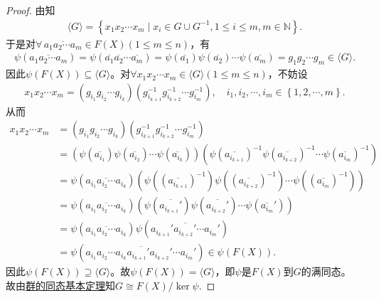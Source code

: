 \documentclass[../../main.tex]{subfiles}%
\begin{document}
\begin{proof}
由知
\begin{align*}
\langle G\rangle =\left\{ x_1x_2\cdots x_m\mid x_i\in G\cup G^{-1},1\leqslant i\leqslant m,m\in \mathbb{N} \right\}.
\end{align*}
于是对$\forall \,\overline{a_1a_2\cdots a_m}\in F\left( X \right) \left( 1\leqslant m\leqslant n \right)$，有
\begin{align*}
\psi \left( \overline{a_1a_2\cdots a_m} \right) =\psi \left( \overline{a_1}\overline{a_2}\cdots \overline{a_m} \right) =\psi \left( \overline{a_1} \right) \psi \left( \overline{a_2} \right) \cdots \psi \left( \overline{a_m} \right) =g_1g_2\cdots g_m\in \langle G\rangle.
\end{align*}
因此$\psi \left( F\left( X \right) \right) \subseteq \langle G\rangle$。对$\forall x_1x_2\cdots x_m\in \langle G\rangle \left( 1\leqslant m\leqslant n \right)$，不妨设
\begin{align*}
x_1x_2\cdots x_m=\left( g_{i_1}g_{i_2}\cdots g_{i_k} \right) \left( g_{i_{k+1}}^{-1}g_{i_{k+2}}^{-1}\cdots g_{i_m}^{-1} \right),\quad i_1,i_2,\cdots ,i_m\in \left\{ 1,2,\cdots ,m \right\}.
\end{align*}
从而
\begin{align*}
x_1x_2\cdots x_m&=\left( g_{i_1}g_{i_2}\cdots g_{i_k} \right) \left( g_{i_{k+1}}^{-1}g_{i_{k+2}}^{-1}\cdots g_{i_m}^{-1} \right) \\
&=\left( \psi \left( \overline{a_{i_1}} \right) \psi \left( \overline{a_{i_2}} \right) \cdots \psi \left( \overline{a_{i_k}} \right) \right) \left( \psi \left( \overline{a_{i_{k+1}}} \right) ^{-1}\psi \left( \overline{a_{i_{k+2}}} \right) ^{-1}\cdots \psi \left( \overline{a_{i_m}} \right) ^{-1} \right) \\
&=\psi \left( \overline{a_{i_1}a_{i_2}\cdots a_{i_k}} \right) \left( \psi \left( \left( \overline{a_{i_{k+1}}} \right) ^{-1} \right) \psi \left( \left( \overline{a_{i_{k+2}}} \right) ^{-1} \right) \cdots \psi \left( \left( \overline{a_{i_m}} \right) ^{-1} \right) \right) \\
&=\psi \left( \overline{a_{i_1}a_{i_2}\cdots a_{i_k}} \right) \left( \psi \left( \overline{a_{i_{k+1}}'} \right) \psi \left( \overline{a_{i_{k+2}}'} \right) \cdots \psi \left( \overline{a_{i_m}}' \right) \right) \\
&=\psi \left( \overline{a_{i_1}a_{i_2}\cdots a_{i_k}} \right) \psi \left( \overline{a_{i_{k+1}}'a_{i_{k+2}}'\cdots a_{i_m}'} \right) \\
&=\psi \left( \overline{a_{i_1}a_{i_2}\cdots a_{i_k}a_{i_{k+1}}'a_{i_{k+2}}'\cdots a_{i_m}'} \right) \in \psi \left( F\left( X \right) \right).
\end{align*}
因此$\psi \left( F\left( X \right) \right) \supseteq \langle G\rangle$。故$\psi \left( F\left( X \right) \right) =\langle G\rangle$，即$\psi$是$F\left( X \right)$到$G$的满同态。
故由\hyperref[theorem:群的同态基本定理]{群的同态基本定理}知$G\cong F(X)/\ker\psi$.
\end{proof}
\end{document}
